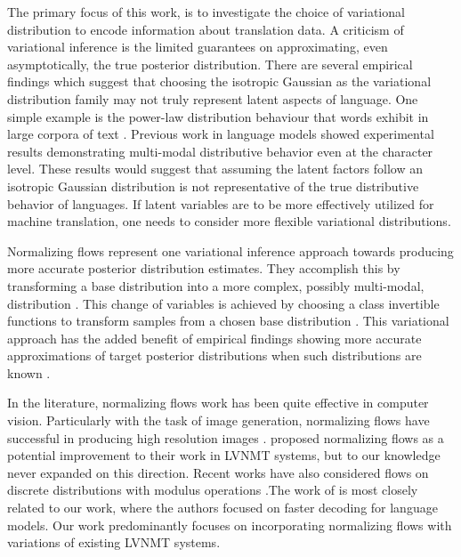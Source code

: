 
The primary focus of this work, is to investigate the choice of variational distribution to encode information about translation data. A criticism of variational inference is the limited guarantees on approximating, even asymptotically, the true posterior distribution. There are several empirical findings which suggest that choosing the isotropic Gaussian as the variational distribution family may not truly represent latent aspects of language. One simple example is the power-law distribution behaviour that words exhibit in large corpora of text \cite{koehnSMT2010}. Previous work in language models showed experimental results demonstrating multi-modal distributive behavior even at the character level\cite{ziegler2019LatentNFforDiscrete}. These results would suggest that assuming the latent factors follow an isotropic Gaussian distribution is not representative of the true distributive behavior of languages. If latent variables are to be more effectively utilized for machine translation, one needs to consider more flexible variational distributions. 

Normalizing flows represent one variational inference approach towards producing more accurate posterior distribution estimates. They accomplish this by transforming a base distribution into a more complex, possibly multi-modal, distribution \cite{tabak2010densityestimationdual,tabak2013familyofnonparametricdensity}. This change of variables is achieved by choosing a class invertible functions to transform samples from a chosen base distribution \cite{rezende2015VIwithNF}. This variational approach has the added benefit of empirical findings showing more accurate approximations of target posterior distributions when such distributions are known \cite{rezende2015VIwithNF}.

In the literature, normalizing flows work has been quite effective in computer vision. Particularly with the task of image generation, normalizing flows have successful in producing high resolution images \cite{ kingma2016IAF, tomczak2016Householder,kingma2018GLOW, Berg2018SylvesterNF}. \citet{schulz2018StochasticDecoder} proposed normalizing flows as a potential improvement to their work in \ac{LVNMT} systems, but to our knowledge never expanded on this direction. Recent works have also considered flows on discrete distributions with modulus operations \cite{hoogeboom2019IntegerDiscreteFlows, tran2019discreteflows}.The work of \citet{ziegler2019LatentNFforDiscrete} is most closely related to our work, where the authors focused on faster decoding for language models. Our work predominantly focuses on incorporating normalizing flows with variations of existing \ac{LVNMT} systems. 


